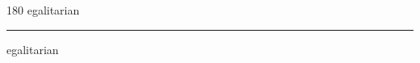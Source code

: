 
\begin{frame}
\begin{center}
\begin{turn}{180}
{\fontsize{2.5cm}{1em}\selectfont egalitarian}
\end{turn}
\vspace{1em}\par  
\hrule
\vspace{1em}\par  
{\fontsize{2.5cm}{1em}\selectfont egalitarian}
\end{center}
\end{frame}
